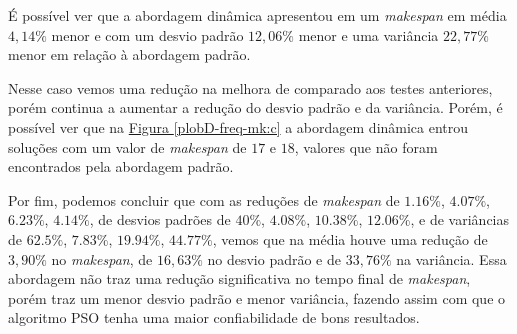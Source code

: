 \begin{table}[!htb]
    \centering
    \caption{Tabela de dados estatísticos da execução do problema D}
    \label{tab:tableD-freq-mk}
\end{table}
É possível ver que a abordagem dinâmica 
apresentou em 
um \textit{makespan} em média $4,14\%$ menor e com um
desvio padrão $12,06\%$ menor e uma
variância $22,77\%$ menor
em relação à abordagem padrão.


Nesse caso vemos uma redução na melhora de comparado aos testes anteriores, porém continua a aumentar a redução do desvio padrão e da variância. Porém, é possível ver que na \hyperref[plobD-freq-mk:c]{Figura \ref{plobD-freq-mk:c}} a abordagem dinâmica entrou soluções com um valor de \textit{makespan} de $17$ e $18$, valores que não foram encontrados pela abordagem padrão.


Por fim, podemos concluir que com as reduções de 
\textit{makespan} de $1.16\%$, $4.07\%$, $6.23\%$, $4.14\%$, de 
desvios padrões de $40\%$, $4.08\%$, $10.38\%$, $12.06\%$, e 
de variâncias de $62.5\%$, $7.83\%$, $19.94\%$, $44.77\%$, vemos que na média houve uma redução de $3,90\%$ no \textit{makespan}, de $16,63\%$ no desvio padrão e de $33,76\%$ na variância. Essa abordagem não traz uma redução significativa no tempo final de \textit{makespan}, porém traz um menor desvio padrão e menor variância, fazendo assim com que o algoritmo PSO tenha uma maior confiabilidade de bons resultados.
